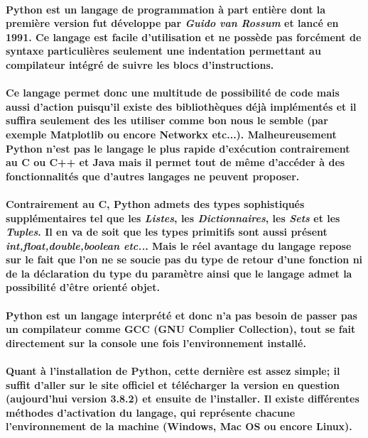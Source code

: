 \documentclass[a4paper, 12pt, twoside]{article}
\begin{document}
\paragraph{Python est un langage de programmation à part entière dont la première version fut développe par \textit{Guido van Rossum} et lancé en 1991. Ce langage est facile d'utilisation et ne possède pas forcément de syntaxe particulières seulement une indentation   permettant au compilateur intégré de suivre les blocs d'instructions.}
\paragraph{Ce langage permet donc une multitude de possibilité de code mais aussi d'action puisqu'il existe des bibliothèques déjà implémentés et il suffira seulement des les utiliser comme bon nous le semble (par exemple Matplotlib ou encore Networkx etc...). Malheureusement Python n'est pas le langage le plus rapide d'exécution contrairement au C ou C++ et Java mais il permet tout de même d'accéder à des fonctionnalités que d'autres langages ne peuvent proposer.}
\paragraph{Contrairement au C, Python admets des types sophistiqués supplémentaires tel que les \textit{Listes}, les \textit{Dictionnaires}, les \textit{Sets} et les \textit{Tuples}. Il en va de soit que les types primitifs sont aussi présent \textit{int,float,double,boolean etc..}. Mais le réel avantage du langage repose sur le fait que l'on ne se soucie pas du type de retour d'une fonction ni de la déclaration du type du paramètre ainsi que le langage admet la possibilité d'être orienté objet.}
\paragraph{Python est un langage interprété et donc n'a pas besoin de passer pas un compilateur comme GCC (GNU Complier Collection), tout se fait directement sur la console une fois l'environnement installé.}
\paragraph{Quant à l'installation de Python, cette dernière est assez simple; il suffit d'aller sur le site officiel et télécharger la version en question (aujourd'hui version 3.8.2) et ensuite de l'installer. Il existe différentes méthodes d'activation du langage, qui représente chacune l'environnement de la machine (Windows, Mac OS ou encore Linux).}
\end{document}
